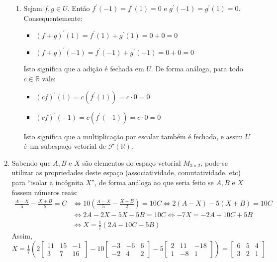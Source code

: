 \documentclass[12pt,a4paper]{article}
\newcommand*\R{\mathbb{R}}
\begin{document}
\begin{enumerate}
\begin{enumerate}
\item Sejam $f,g \in U$. Então $f^\prime(-1) = f^\prime(1) = 0$ e $g^\prime(-1) = g^\prime(1) = 0$. Consequentemente:
\begin{itemize}
\item $(f+g)^\prime(1) = f^\prime(1) + g^\prime(1) = 0 + 0 = 0$
\item $(f+g)^\prime(-1) = f^\prime(-1) + g^\prime(-1) = 0 + 0 = 0$
\end{itemize}
Isto significa que a adição é fechada em $U$. De forma análoga, para todo $c \in \R$ vale:
\begin{itemize}
\item $(cf)^\prime(1) = c(f^\prime(1)) = c \cdot 0 = 0$
\item $(cf)^\prime(-1) = c(f^\prime(-1)) = c \cdot 0 = 0$
\end{itemize}
Isto significa que a multiplicação por escalar também é fechada, e assim $U$ é um subespaço vetorial de $\mathcal{F}(\R)$.
\end{enumerate}

\item Sabendo que $A,B$ e $X$ são elementos do espaço vetorial $M_{3 \times 2}$, pode-se utilizar as propriedades deste espaço (associatividade, comutatividade, etc) para ``isolar a incógnita $X$'', de forma análoga ao que seria feito se $A,B$ e $X$ fossem números reais:
\begin{align*}
\frac{A-X}{5}-\frac{X+B}{2} = C
& \Leftrightarrow
10\left(\frac{A-X}{5}-\frac{X+B}{2}\right) = 10 C
\Leftrightarrow
2(A-X)-5(X+B) = 10 C\\
& \Leftrightarrow
2A - 2X - 5X - 5B = 10 C
\Leftrightarrow
-7X = -2A + 10C + 5B\\
& \Leftrightarrow
X = \frac{1}{7}(2A - 10C - 5B)
\end{align*}
Assim, $X = \frac{1}{7}\left(2\begin{bmatrix}
11 & 15 & -1 \\
 3 &  7 & 16
\end{bmatrix} - 10\begin{bmatrix}
-3 & -6 & 6\\
-2 &  4 & 2
\end{bmatrix} - 5\begin{bmatrix}
2 & 11 & -18  \\
1 & -8 &  1
\end{bmatrix}\right)
=\begin{bmatrix}
6 & 5 & 4  \\
3 & 2 & 1
\end{bmatrix}$


\end{enumerate}
\end{document}
